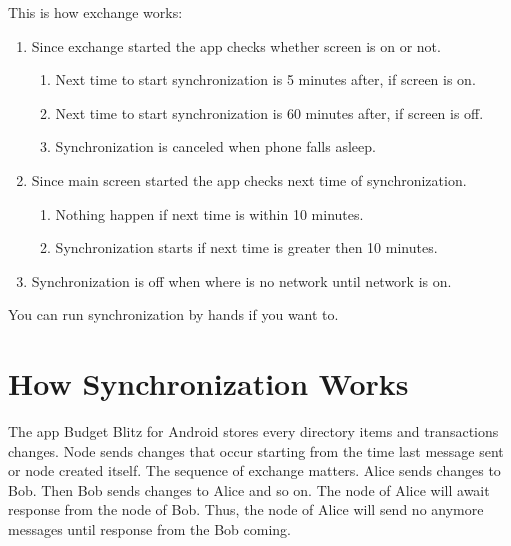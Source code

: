 \documentclass[a4paper,10pt,english]{sphinxmanual}
\begin{document}
\sphinxAtStartPar
This is how exchange works:
\begin{enumerate}
%
\item {} 
\sphinxAtStartPar
Since exchange started the app checks whether screen is on or not.
\begin{enumerate}
%
\item {} 
\sphinxAtStartPar
Next time to start synchronization is 5 minutes after, if screen is on.

\item {} 
\sphinxAtStartPar
Next time to start synchronization is 60 minutes after, if screen is off.

\item {} 
\sphinxAtStartPar
Synchronization is canceled when phone falls asleep.

\end{enumerate}

\item {} 
\sphinxAtStartPar
Since main screen started the app checks next time of synchronization.
\begin{enumerate}
%
\item {} 
\sphinxAtStartPar
Nothing happen if next time is within 10 minutes.

\item {} 
\sphinxAtStartPar
Synchronization starts if next time is greater then 10 minutes.

\end{enumerate}

\item {} 
\sphinxAtStartPar
Synchronization is off when where is no network until network is on.

\end{enumerate}

\sphinxAtStartPar
You can run synchronization by hands if you want to.


\section{How Synchronization Works}
\label{\detokenize{teamwork:how-synchronization-works}}
\sphinxAtStartPar
The app Budget Blitz for Android stores every directory items and transactions changes. Node sends changes
that occur starting from the time last message sent or node created itself. The sequence
of exchange matters. Alice sends changes to Bob. Then Bob sends changes to Alice and so on.
The node of Alice will await response from the node of Bob. Thus, the node of Alice will send
no anymore messages until response from the Bob coming.
\end{document}
